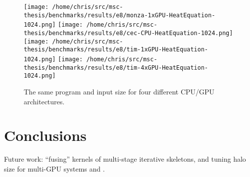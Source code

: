\begin{figure}
\texttt{[image: /home/chris/src/msc-thesis/benchmarks/results/e8/monza-1xGPU-HeatEquation-1024.png]}
\texttt{[image: /home/chris/src/msc-thesis/benchmarks/results/e8/cec-CPU-HeatEquation-1024.png]}
\texttt{[image: /home/chris/src/msc-thesis/benchmarks/results/e8/tim-1xGPU-HeatEquation-1024.png]}
\texttt{[image: /home/chris/src/msc-thesis/benchmarks/results/e8/tim-4xGPU-HeatEquation-1024.png]}
\caption{%
  The same program and input size for four different CPU/GPU architectures.%
}
\end{figure}


\newpage
\section{Conclusions}

Future work: ``fusing'' kernels of multi-stage iterative skeletons,
and tuning halo size for multi-GPU systems and .

